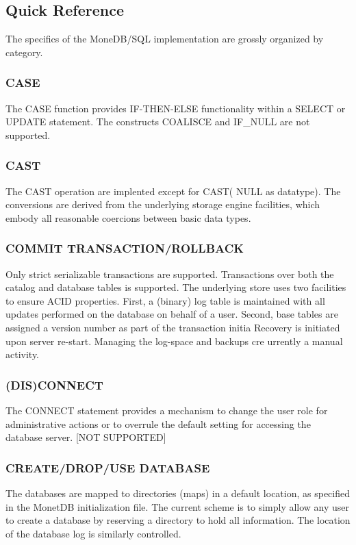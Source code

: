 \documentclass[10pt,twocolumn,fleqn]{article}
\begin{document}
\subsection{Quick Reference}
The specifics of the MoneDB/SQL implementation are grossly organized
by category.

\subsubsection*{CASE}
The CASE function provides IF-THEN-ELSE functionality within
a SELECT or UPDATE statement. The constructs COALISCE and IF\_NULL are
not supported.

\subsubsection*{CAST}
The CAST operation  are implented except for CAST( NULL as datatype).
The conversions are derived from the underlying storage engine facilities,
which embody all reasonable coercions between basic data types.

\subsubsection*{COMMIT TRANSACTION/ROLLBACK }
Only strict serializable transactions are supported.
Transactions over both the catalog and database tables is supported.
The underlying store uses two facilities to ensure ACID properties.
First, a (binary) log table is maintained with all updates performed
on the database on behalf of a user. Second, base tables are assigned
a version number as part of the transaction initia
Recovery is initiated upon server re-start.
Managing the log-space and backups cre urrently a manual activity.

\subsubsection*{(DIS)CONNECT }

The CONNECT statement provides a mechanism to change the user role
for administrative actions or to overrule the default setting for
accessing the database server. [NOT SUPPORTED]

\subsubsection*{CREATE/DROP/USE DATABASE}
The databases are mapped to directories (maps) in a default location, as 
specified in the MonetDB initialization file. The current scheme is 
to simply allow any user to create a database by reserving a
directory to hold all information. The location of the database
log is similarly controlled.
\end{document}
